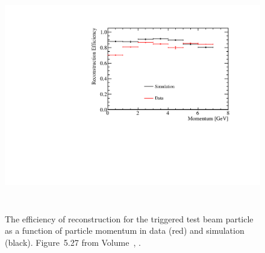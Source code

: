 \begin{figure}[htp]
\centering
\includegraphics[height=4in]{graphics/BeamParticleEfficiencyVsMomentum.pdf}
\caption[Efficiency of reconstruction for the triggered test beam particle]{The efficiency of reconstruction for the triggered test beam particle as a function of particle
momentum in data (red) and simulation (black). Figure~5.27 from Volume~\volnumberphysics{}, \voltitlephysics{}.}
\label{fig:ch-exec-comp-tracking}
\end{figure}






